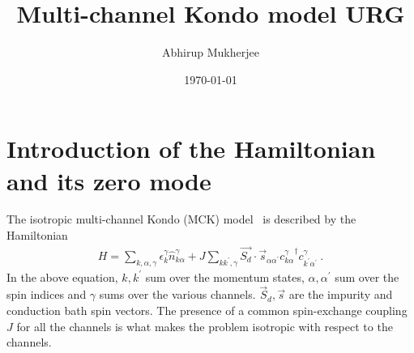 \documentclass[12pt]{revtex4-2}
\begin{document}
\title{Multi-channel Kondo model URG}
\author{Abhirup Mukherjee}
\date{\today}
\maketitle
\tableofcontents
\section{Introduction of the Hamiltonian and its zero mode}
The isotropic multi-channel Kondo (MCK) model~\cite{Noz_blandin_1980,Gan_Andrei_Coleman_1993,emery_kivelson,Gan_mchannel_1994,Tsvelick_Weigmann_mchannel_1984,Tsvelick_weigmann_mchannel_1985,parcollet_olivier_large_N,kimura_taro_Su_N_kondo,PhysRevB.73.224445,cox_jarrell_two_channel_rev,affleck_1991_overscreen,Coleman_tsvelik,affleck1993exact} is described by the Hamiltonian
\begin{align}
	\label{mc_ham}
	H = \sum_{k,\alpha,\gamma}\epsilon_{k}^\gamma \hat n^\gamma_{k\alpha} + J\sum_{kk^\prime,\gamma} \vec{S_d}\cdot\vec{s}_{\alpha\alpha^\prime}{c^\gamma_{k\alpha}}^\dagger c^\gamma_{k^\prime\alpha^\prime}~.
\end{align}
In the above equation, \(k,k^\prime\) sum over the momentum states, \(\alpha,\alpha^\prime\) sum over the spin indices and \(\gamma\) sums over the various channels. \(\vec S_d, \vec s\) are the impurity and conduction bath spin vectors. The presence of a common spin-exchange coupling \(J\) for all the channels is what makes the problem isotropic with respect to the channels.
\end{document}
